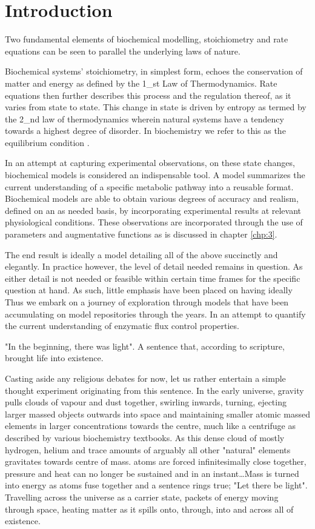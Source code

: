 \chapter{Introduction}
\label{chp:1}
Two fundamental elements of biochemical modelling, stoichiometry and rate equations can be seen to parallel the underlying laws of nature. 

Biochemical systems' stoichiometry, in simplest form, echoes the conservation of matter and energy as defined by the 1_{st} Law of Thermodynamics. Rate equations then further describes this process and the regulation thereof, as it varies from state to state. This change in state is driven by entropy as termed by the 2_{nd} law of thermodynamics wherein natural systems have a tendency towards a highest degree of disorder. In biochemistry we refer to this as the equilibrium condition \cite{Prigogine1998}. 

In an attempt at capturing experimental observations, on these state changes, biochemical models is considered an indispensable tool. A model summarizes the current understanding of a specific metabolic pathway into a reusable format. Biochemical models are able to obtain various degrees of accuracy and realism, defined on an as needed basis, by incorporating experimental results at relevant physiological conditions. These observations are incorporated through the use of parameters and augmentative functions as is discussed in chapter \ref{chp:3}. 

The end result is ideally a model detailing all of the above succinctly and elegantly. In practice however, the level of detail needed remains in question. As either detail is not needed or feasible within certain time frames for the specific question at hand. As such, little emphasis have been placed on having ideally Thus we embark on a journey of exploration through models that have been accumulating on model repositories through the years. In an attempt to quantify the current understanding of enzymatic flux control properties.




"In the beginning, there was light". A sentence that, according to scripture, brought life into existence.

Casting aside any religious debates for now, let us rather entertain a simple thought experiment originating from this sentence. In the early universe, gravity pulls clouds of vapour and dust together, swirling inwards, turning, ejecting larger massed objects outwards into space and maintaining smaller atomic massed elements in larger concentrations towards the centre, much like a centrifuge as described by various biochemistry textbooks. As this dense cloud of mostly hydrogen, helium and trace amounts of arguably all other "natural" elements gravitates towards centre of mass. atoms are forced infinitesimally close together,  pressure and heat can no longer be sustained and in an instant\ldots Mass is turned into energy as atoms fuse together and a sentence rings true; "Let there be light". Travelling across the universe as a carrier state, packets of energy moving through space, heating matter as it spills onto, through, into and across all of existence.  

